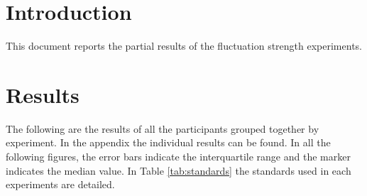 \documentclass[a4paper]{article}
\begin{document}

\section{Introduction} %
\label{sec:introduction}

This document reports the partial results of the fluctuation strength
experiments.


\section{Results} %
\label{sec:results}

The following are the results of all the participants grouped together by
experiment. In the appendix the individual results can be found. In all the
following figures, the error bars indicate the interquartile range and the
marker indicates the median value. In Table \ref{tab:standards} the standards
used in each experiments are detailed.
\end{document}

